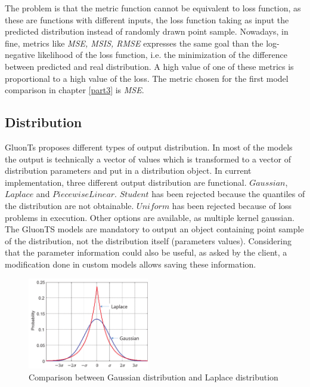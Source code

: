 The problem is that the metric function cannot be equivalent to loss function, as these are functions with different inputs, the loss function taking as input the predicted distribution instead of randomly drawn point sample.
Nowadays, in fine, metrics like \textit{MSE, MSIS, RMSE} expresses the same goal than the log-negative likelihood of the loss function, i.e. the minimization of the difference between predicted and real distribution.
A high value of one of these metrics is proportional to a high value of the loss.
The metric chosen for the first model comparison in chapter \ref{part3} is \textit{MSE}.



\subsection{Distribution}\label{distribution}

GluonTs proposes different types of output distribution. In most of the models the output is technically
 a vector of values which is
transformed to a vector of distribution parameters  and put in a distribution object.
In current implementation, three different output distribution are functional. $Gaussian$, $Laplace$ and $PiecewiseLinear$.
$Student$ has been rejected because the quantiles of the distribution are not obtainable.
$Uniform$ has been rejected because of loss problems in execution.
Other options are available, as multiple kernel gaussian.
The GluonTS models are mandatory to output an object containing point sample of the distribution, not the distribution itself (parameters values). Considering that the parameter information could also be useful, as asked by the client, a modification done in custom models allows saving these information.

\begin{figure}[H]
    \centering
    \includegraphics[width=200px]{Gaussian-distribution-and-Laplace-distribution.ppm.png}
    \caption{Comparison between Gaussian distribution and Laplace distribution}
    \label{fig:gausslaplace}
\end{figure}

